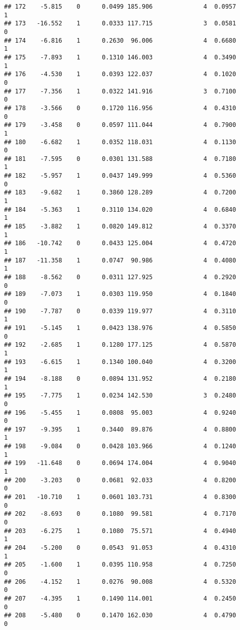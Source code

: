 \documentclass[
]{article}
\begin{document}
\begin{verbatim}
## 172    -5.815    0      0.0499 185.906              4  0.0957      1
## 173   -16.552    1      0.0333 117.715              3  0.0581      0
## 174    -6.816    1      0.2630  96.006              4  0.6680      1
## 175    -7.893    1      0.1310 146.003              4  0.3490      1
## 176    -4.530    1      0.0393 122.037              4  0.1020      0
## 177    -7.356    1      0.0322 141.916              3  0.7100      0
## 178    -3.566    0      0.1720 116.956              4  0.4310      0
## 179    -3.458    0      0.0597 111.044              4  0.7900      1
## 180    -6.682    1      0.0352 118.031              4  0.1130      0
## 181    -7.595    0      0.0301 131.588              4  0.7180      1
## 182    -5.957    1      0.0437 149.999              4  0.5360      0
## 183    -9.682    1      0.3860 128.289              4  0.7200      1
## 184    -5.363    1      0.3110 134.020              4  0.6840      1
## 185    -3.882    1      0.0820 149.812              4  0.3370      1
## 186   -10.742    0      0.0433 125.004              4  0.4720      1
## 187   -11.358    1      0.0747  90.986              4  0.4080      1
## 188    -8.562    0      0.0311 127.925              4  0.2920      0
## 189    -7.073    1      0.0303 119.950              4  0.1840      0
## 190    -7.787    0      0.0339 119.977              4  0.3110      1
## 191    -5.145    1      0.0423 138.976              4  0.5850      0
## 192    -2.685    1      0.1280 177.125              4  0.5870      1
## 193    -6.615    1      0.1340 100.040              4  0.3200      1
## 194    -8.188    0      0.0894 131.952              4  0.2180      1
## 195    -7.775    1      0.0234 142.530              3  0.2480      0
## 196    -5.455    1      0.0808  95.003              4  0.9240      0
## 197    -9.395    1      0.3440  89.876              4  0.8800      1
## 198    -9.084    0      0.0428 103.966              4  0.1240      1
## 199   -11.648    0      0.0694 174.004              4  0.9040      1
## 200    -3.203    0      0.0681  92.033              4  0.8200      0
## 201   -10.710    1      0.0601 103.731              4  0.8300      0
## 202    -8.693    0      0.1080  99.581              4  0.7170      0
## 203    -6.275    1      0.1080  75.571              4  0.4940      1
## 204    -5.200    0      0.0543  91.053              4  0.4310      1
## 205    -1.600    1      0.0395 110.958              4  0.7250      0
## 206    -4.152    1      0.0276  90.008              4  0.5320      0
## 207    -4.395    1      0.1490 114.001              4  0.2450      0
## 208    -5.480    0      0.1470 162.030              4  0.4790      0

\end{verbatim}
\end{document}

